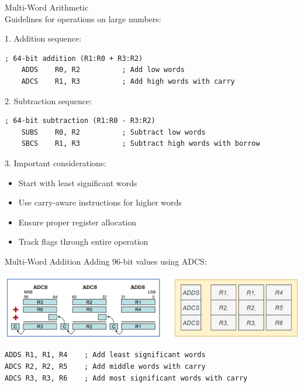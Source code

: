 \begin{KR}{Multi-Word Arithmetic}\\
Guidelines for operations on large numbers:

1. Addition sequence:
\begin{lstlisting}[language=armasm, style=basesmol]
    ; 64-bit addition (R1:R0 + R3:R2)
    ADDS    R0, R2          ; Add low words
    ADCS    R1, R3          ; Add high words with carry
\end{lstlisting}

2. Subtraction sequence:
\begin{lstlisting}[language=armasm, style=basesmol]
    ; 64-bit subtraction (R1:R0 - R3:R2)
    SUBS    R0, R2          ; Subtract low words
    SBCS    R1, R3          ; Subtract high words with borrow
\end{lstlisting}

3. Important considerations:
\begin{itemize}
  \item Start with least significant words
  \item Use carry-aware instructions for higher words
  \item Ensure proper register allocation
  \item Track flags through entire operation
\end{itemize}
\end{KR}

\begin{example2}{Multi-Word Addition}
Adding 96-bit values using ADCS:

\includegraphics[width=\linewidth]{images/multiwordadd.png}

\begin{lstlisting}[language=armasm, style=basesmol]
ADDS R1, R1, R4    ; Add least significant words
ADCS R2, R2, R5    ; Add middle words with carry
ADCS R3, R3, R6    ; Add most significant words with carry
\end{lstlisting}
\end{example2}

